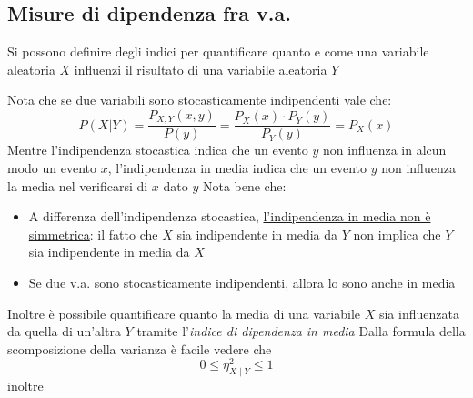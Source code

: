 \subsection{Misure di dipendenza fra v.a.}
Si possono definire degli indici per quantificare quanto e come una variabile aleatoria $ X $ influenzi il risultato di una variabile aleatoria $ Y $

Nota che se due variabili sono stocasticamente indipendenti vale che:
\[
	P\left(X|Y\right) = \frac{P_{X,Y}\left(x,y\right)}{P\left(y\right)} = \frac{P_X\left(x\right) \cdot  P_Y\left(y\right)}{P_Y\left(y\right)} = P_X\left(x\right)
\]
Mentre l'indipendenza stocastica indica che un evento $ y $ non influenza in alcun modo un evento $ x $, l'indipendenza in media indica che un evento $ y $ non influenza la media nel verificarsi di $ x $ dato $ y $
\vskip3mm
Nota bene che:
\begin{itemize}
	\item A differenza dell'indipendenza stocastica, \underline{l'indipendenza in media non è simmetrica}: il fatto che $ X $ sia indipendente in media da $ Y $ non implica che $ Y $ sia indipendente in media da $ X $
	\item Se due v.a. sono stocasticamente indipendenti, allora lo sono anche in media
\end{itemize}
Inoltre è possibile quantificare quanto la media di una variabile $ X $ sia influenzata da quella di un'altra $ Y $ tramite l'\textit{indice di dipendenza in media}
Dalla formula della scomposizione della varianza è facile vedere che
\[
	0 \leq \eta_{X \mid Y}^2 \leq 1
\]
inoltre
